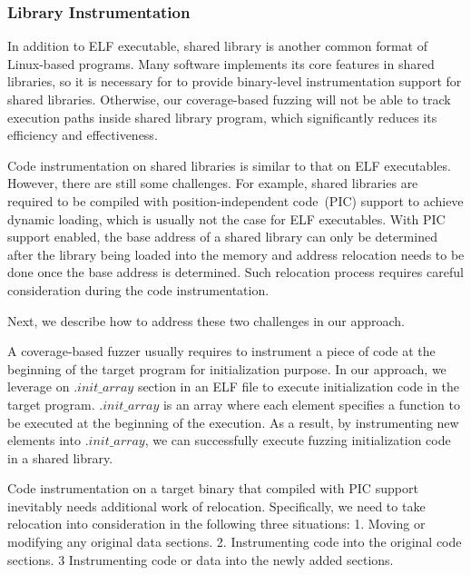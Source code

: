\subsubsection{\bf{Library Instrumentation}}

In addition to ELF executable, shared library is another common format of Linux-based programs. Many software implements its core features in shared libraries, so it is necessary for \sysname to provide binary-level instrumentation support for shared libraries. Otherwise, our coverage-based fuzzing will not be able to track execution paths inside shared library program, which significantly reduces its efficiency and effectiveness. 

Code instrumentation on shared libraries is similar to that on ELF executables. However, there are still some challenges. For example, shared libraries are required to be compiled with position-independent code~(PIC) support\cite{pic} to achieve dynamic loading, which is usually not the case for ELF executables. With PIC support enabled, the base address of a shared library can only be determined after the library being loaded into the memory and address relocation needs to be done once the base address is determined. Such relocation process requires careful consideration during the code instrumentation.

Next, we describe how to address these two challenges in our approach.
\vspace{5pt} 

 A coverage-based fuzzer usually requires to instrument a piece of code at the beginning of the target program for initialization purpose. In our approach, we leverage on $.init\_array$ section in an ELF file to execute initialization code in the target program. $.init\_array$ is an array where each element specifies a function to be executed at the beginning of the execution. As a result, by instrumenting new elements into $.init\_array$, we can successfully execute fuzzing initialization code in a shared library.
\vspace{5pt} 

 Code instrumentation on a target binary that compiled with PIC support inevitably needs additional work of relocation. Specifically, we need to take relocation into consideration in the following three situations: 1. Moving or modifying any original data sections. 2. Instrumenting code into the original code sections. 3 Instrumenting code or data into the newly added sections. 


